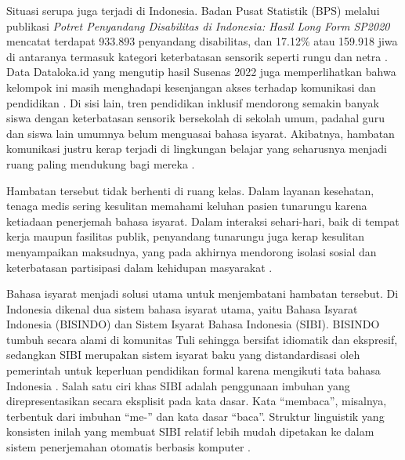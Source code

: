 Situasi serupa juga terjadi di Indonesia. Badan Pusat Statistik (BPS) melalui publikasi \textit{Potret Penyandang Disabilitas di Indonesia: Hasil Long Form SP2020} mencatat terdapat 933.893 penyandang disabilitas, dan 17.12\% atau 159.918 jiwa di antaranya termasuk kategori keterbatasan sensorik seperti rungu dan netra \cite{BadanPusatStatistikBPS2024}. Data Dataloka.id yang mengutip hasil Susenas 2022 juga memperlihatkan bahwa kelompok ini masih menghadapi kesenjangan akses terhadap komunikasi dan pendidikan \cite{Datalokaid2023}. Di sisi lain, tren pendidikan inklusif mendorong semakin banyak siswa dengan keterbatasan sensorik bersekolah di sekolah umum, padahal guru dan siswa lain umumnya belum menguasai bahasa isyarat. Akibatnya, hambatan komunikasi justru kerap terjadi di lingkungan belajar yang seharusnya menjadi ruang paling mendukung bagi mereka \cite{Ratriyana2022}.\par

Hambatan tersebut tidak berhenti di ruang kelas. Dalam layanan kesehatan, tenaga medis sering kesulitan memahami keluhan pasien tunarungu karena ketiadaan penerjemah bahasa isyarat. Dalam interaksi sehari-hari, baik di tempat kerja maupun fasilitas publik, penyandang tunarungu juga kerap kesulitan menyampaikan maksudnya, yang pada akhirnya mendorong isolasi sosial dan keterbatasan partisipasi dalam kehidupan masyarakat \cite{Tannenbaum-Baruchi2025}.\par

Bahasa isyarat menjadi solusi utama untuk menjembatani hambatan tersebut. Di Indonesia dikenal dua sistem bahasa isyarat utama, yaitu Bahasa Isyarat Indonesia (BISINDO) dan Sistem Isyarat Bahasa Indonesia (SIBI). BISINDO tumbuh secara alami di komunitas Tuli sehingga bersifat idiomatik dan ekspresif, sedangkan SIBI merupakan sistem isyarat baku yang distandardisasi oleh pemerintah untuk keperluan pendidikan formal karena mengikuti tata bahasa Indonesia \cite{Ratriyana2022,Zulpicha2017}. Salah satu ciri khas SIBI adalah penggunaan imbuhan yang direpresentasikan secara eksplisit pada kata dasar. Kata ``membaca'', misalnya, terbentuk dari imbuhan ``me-'' dan kata dasar ``baca''. Struktur linguistik yang konsisten inilah yang membuat SIBI relatif lebih mudah dipetakan ke dalam sistem penerjemahan otomatis berbasis komputer \cite{RakunWidhinugraha2022}.\par


